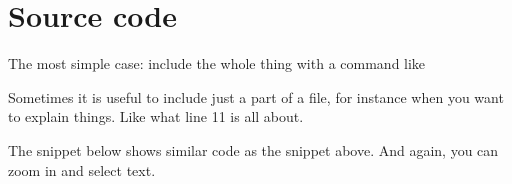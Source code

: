\section{Source code}
The most simple case: include the whole thing with a command like \\
\verb##


Sometimes it is useful to include just a part of a file, for instance
when you want to explain things. Like what line 11 is all about.\\
\verb##



The snippet below shows similar code as the snippet above.
And again, you can zoom in and select text.







